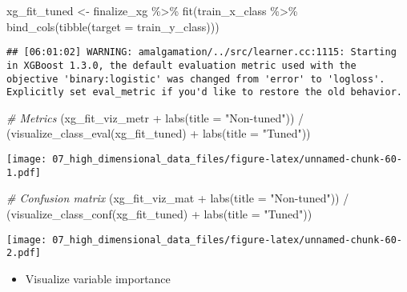 \documentclass[
]{book}
\newenvironment{Shaded}{\begin{snugshade}}{\end{snugshade}}
\newcommand{\AttributeTok}[1]{\textcolor[rgb]{0.77,0.63,0.00}{#1}}
\newcommand{\CommentTok}[1]{\textcolor[rgb]{0.56,0.35,0.01}{\textit{#1}}}
\newcommand{\FunctionTok}[1]{\textcolor[rgb]{0.00,0.00,0.00}{#1}}
\newcommand{\NormalTok}[1]{#1}
\newcommand{\OtherTok}[1]{\textcolor[rgb]{0.56,0.35,0.01}{#1}}
\newcommand{\SpecialCharTok}[1]{\textcolor[rgb]{0.00,0.00,0.00}{#1}}
\newcommand{\StringTok}[1]{\textcolor[rgb]{0.31,0.60,0.02}{#1}}
\providecommand{\tightlist}{%
  \setlength{\itemsep}{0pt}\setlength{\parskip}{0pt}}
\begin{document}
\begin{Shaded}
\begin{Highlighting}[]
\NormalTok{xg\_fit\_tuned }\OtherTok{\textless{}{-}}\NormalTok{ finalize\_xg }\SpecialCharTok{\%\textgreater{}\%}
  \FunctionTok{fit}\NormalTok{(train\_x\_class }\SpecialCharTok{\%\textgreater{}\%} \FunctionTok{bind\_cols}\NormalTok{(}\FunctionTok{tibble}\NormalTok{(}\AttributeTok{target =}\NormalTok{ train\_y\_class)))}
\end{Highlighting}
\end{Shaded}

\begin{verbatim}
## [06:01:02] WARNING: amalgamation/../src/learner.cc:1115: Starting in XGBoost 1.3.0, the default evaluation metric used with the objective 'binary:logistic' was changed from 'error' to 'logloss'. Explicitly set eval_metric if you'd like to restore the old behavior.
\end{verbatim}

\begin{Shaded}
\begin{Highlighting}[]
\CommentTok{\# Metrics}
\NormalTok{(xg\_fit\_viz\_metr }\SpecialCharTok{+} \FunctionTok{labs}\NormalTok{(}\AttributeTok{title =} \StringTok{"Non{-}tuned"}\NormalTok{)) }\SpecialCharTok{/}\NormalTok{ (}\FunctionTok{visualize\_class\_eval}\NormalTok{(xg\_fit\_tuned) }\SpecialCharTok{+} \FunctionTok{labs}\NormalTok{(}\AttributeTok{title =} \StringTok{"Tuned"}\NormalTok{))}
\end{Highlighting}
\end{Shaded}

\texttt{[image: 07\_high\_dimensional\_data\_files/figure-latex/unnamed-chunk-60-1.pdf]}

\begin{Shaded}
\begin{Highlighting}[]
\CommentTok{\# Confusion matrix}
\NormalTok{(xg\_fit\_viz\_mat }\SpecialCharTok{+} \FunctionTok{labs}\NormalTok{(}\AttributeTok{title =} \StringTok{"Non{-}tuned"}\NormalTok{)) }\SpecialCharTok{/}\NormalTok{ (}\FunctionTok{visualize\_class\_conf}\NormalTok{(xg\_fit\_tuned) }\SpecialCharTok{+} \FunctionTok{labs}\NormalTok{(}\AttributeTok{title =} \StringTok{"Tuned"}\NormalTok{))}
\end{Highlighting}
\end{Shaded}

\texttt{[image: 07\_high\_dimensional\_data\_files/figure-latex/unnamed-chunk-60-2.pdf]}

\begin{itemize}
\tightlist
\item
  Visualize variable importance
\end{itemize}
\end{document}
